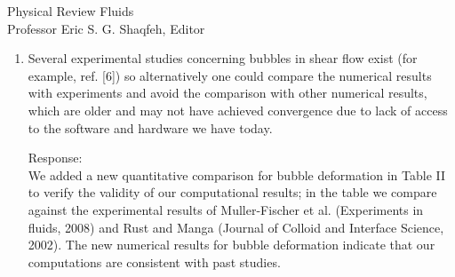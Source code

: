 \documentclass{letter}
\begin{document}
\begin{letter}{
Physical Review Fluids\\
Professor Eric S. G. Shaqfeh, Editor\\}
\begin{enumerate}
\par\noindent
In response to the enquiry ``The mesh convergence
study seems quite incomplete.  A more complete study with figures to verify it
should be included in an appendix concerning the mesh and time step
independence of the results.'', we have modified Figure 3 to report results
for three different grid resolutions.  Figure 3 illustrates that we
capture the proper break-up time as the grid is refined, and at the point
where the critical Reynolds' number is prescribed.  In Figure 3,
we point out that the time step was $O(10^{-5}$)s for the 
elongating bubble! ($\Delta x=R/16$) Further refinements reduce the
time step according to the surface tension time step constraint
(see section III(A)).  We now report in the revision the temporal
discretization of our method along with the timestep constraint.
Since surface tension is discretized explicitly in time, the
surface tension time step constraint is much more restrictive than
the classical CFL time step constraint of $\Delta x/U$.
(again see section IIIA).

\par\noindent
\item
\textsf
{\color{red} Several experimental studies concerning bubbles in shear flow
exist (for example, ref. [6]) so alternatively one could compare the numerical
results with experiments and avoid the comparison with other numerical results,
which are older and may not have achieved convergence due to lack of access to
the software and hardware we have today.}
\vspace{3 mm}

Response: \\
{\color{red} 
We added a new quantitative comparison for bubble deformation in Table
I\hspace{-1.2pt}I to verify the validity of our computational results; in the
table we compare against the experimental results of Muller-Fischer et al.
(Experiments in fluids, 2008) and Rust and Manga (Journal of Colloid and
Interface Science, 2002). The new numerical results for bubble deformation
indicate that our computations are consistent with past studies.
}
\\


\end{enumerate}
\end{letter}
\end{document}
